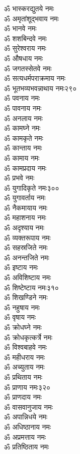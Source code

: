 \begin{center}
\begin{multicols}{2}
\begin{flushleft}
ॐ भास्करद्युतये नमः\\
ॐ अमृतांशूद्भवाय नमः\\
ॐ भानवे नमः\\
ॐ शशबिन्दवे नमः\\
ॐ सुरेश्वराय नमः\\
ॐ औषधाय नमः\\
ॐ जगतस्सेतवे नमः\\
ॐ सत्यधर्मपराक्रमाय नमः\\
ॐ भूतभव्यभवन्नाथाय नमः\hfill २९०\\
ॐ पवनाय नमः\\
ॐ पावनाय नमः\\
ॐ अनलाय नमः\\
ॐ कामघ्ने नमः\\
ॐ कामकृते नमः\\
ॐ कान्ताय नमः\\
ॐ कामाय नमः\\
ॐ कामप्रदाय नमः\\
ॐ प्रभवे नमः\\
ॐ युगादिकृते नमः\hfill ३००\\
ॐ युगावर्ताय नमः\\
ॐ नैकमायाय नमः\\
ॐ महाशनाय नमः\\
ॐ अदृश्याय नमः\\
ॐ व्यक्तरूपाय नमः\\
ॐ सहस्रजिते नमः\\
ॐ अनन्तजिते नमः\\
ॐ इष्टाय नमः\\
ॐ अविशिष्टाय नमः\\
ॐ शिष्टेष्टाय नमः\hfill ३१०\\
ॐ शिखण्डिने नमः\\
ॐ नहुषाय नमः\\
ॐ वृषाय नमः\\
ॐ क्रोधघ्ने नमः\\
ॐ क्रोधकृत्कर्त्रे नमः\\
ॐ विश्वबाहवे नमः\\
ॐ महीधराय नमः\\
ॐ अच्युताय नमः\\
ॐ प्रथिताय नमः\\
ॐ प्राणाय नमः\hfill ३२०\\
ॐ प्राणदाय नमः\\
ॐ वासवानुजाय नमः\\
ॐ अपान्निधये नमः\\
ॐ अधिष्ठानाय नमः\\
ॐ अप्रमत्ताय नमः\\
ॐ प्रतिष्ठिताय नमः\\

\end{flushleft}
\end{multicols}
\end{center}
